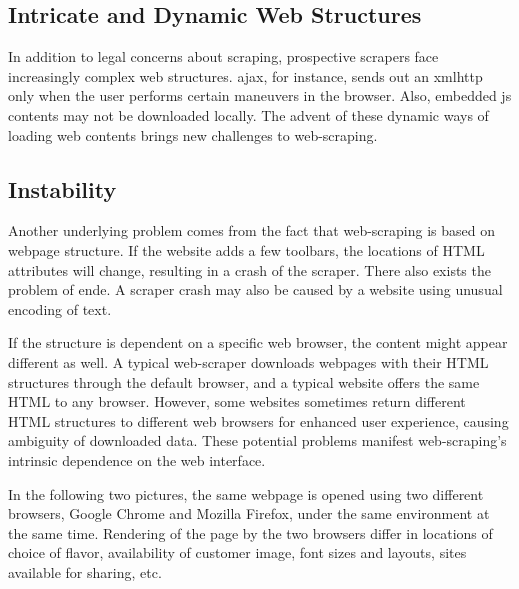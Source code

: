 \documentclass[12pt,twoside,draft]{report}
\begin{document}
\subsection{Intricate and Dynamic Web Structures}

In addition to legal concerns about scraping, prospective scrapers face increasingly complex web structures. \gls{ajax}, for instance, sends out an \gls{xmlhttp} only when the user performs certain maneuvers in the browser. Also, embedded \gls{js} contents may not be downloaded locally. The advent of these dynamic ways of loading web contents brings new challenges to web-scraping.

\subsection{Instability}
Another underlying problem comes from the fact that web-scraping is based on webpage structure. If the website adds a few toolbars, the locations of HTML attributes will change, resulting in a crash of the scraper. There also exists the problem of \gls{ende}. A scraper crash may also be caused by a website using unusual encoding of text. 

If the structure is dependent on a specific web browser, the content might appear different as well. A typical web-scraper downloads webpages with their HTML structures through the default browser, and a typical website offers the same HTML to any browser. However, some websites sometimes return different HTML structures to different web browsers for enhanced user experience, causing ambiguity of downloaded data. These potential problems manifest web-scraping's intrinsic dependence on the web interface.

In the following two pictures, the same webpage is opened using two different browsers, Google Chrome and Mozilla Firefox, under the same environment at the same time. Rendering of the page by the two browsers differ in locations of choice of flavor, availability of customer image, font sizes and layouts, sites available for sharing, etc.
\end{document}
